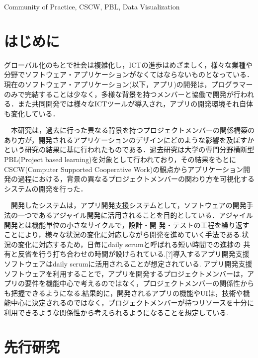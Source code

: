 \documentclass[submit,techrep]{ipsj}
\begin{document}
\begin{ekeyword}
Community of Practice, CSCW, PBL, Data Visualization
\end{ekeyword}

\maketitle

\section{はじめに}

グローバル化のもとで社会は複雑化し，ICTの進歩はめざましく，様々な業種や分野でソフトウェア・アプリケーションがなくてはならないものとなっている．現在のソフトウェア・アプリケーション(以下，アプリ)の開発は，プログラマーのみで完結することは少なく，多様な背景を持つメンバーと協働で開発が行われる．また共同開発では様々なICTツールが導入され，アプリの開発環境それ自体も変化している．


　本研究は，過去に行った異なる背景を持つプロジェクトメンバーの関係構築のあり方が，開発されるアプリケーションのデザインにどのような影響を及ぼすかという研究の結果に基に行われたものである．過去研究は大学の専門分野横断型PBL(Project based learning)を対象として行われており，その結果をもとにCSCW(Computer Supported Cooperative Work)の観点からアプリケーション開発の過程における，背景の異なるプロジェクトメンバーの関わり方を可視化するシステムの開発を行った．


　開発したシステムは，アプリ開発支援システムとして，ソフトウェアの開発手法の一つであるアジャイル開発に活用されることを目的としている．アジャイル開発とは機能単位の小さなサイクルで，設計・開 発・テストの工程を繰り返すことにより，様々な状況の変化に対応しながら開発を進めていく手法である.状況の変化に対応するため，日毎にdaily scrumと呼ばれる短い時間での進捗の 共有と反省を行う打ち合わせの時間が設けられている.[?]導入するアプリ開発支援ソフトウェアはdaily scrumに活用されることが想定されている.
アプリ開発支援ソフトウェアを利用することで，アプリを開発するプロジェクトメンバーは，アプリの要件を機能中心で考えるのではなく，プロジェクトメンバーの関係性からも把握できるようになる.結果的に，開発されるアプリの機能やUIは，技術や機能中心に決定されるのではなく，プロジェクトメンバーが持つリソースを十分に利用できるような関係性から考えられるようになることを想定している.

\section{先行研究}
\label{previous-research}
\end{document}
